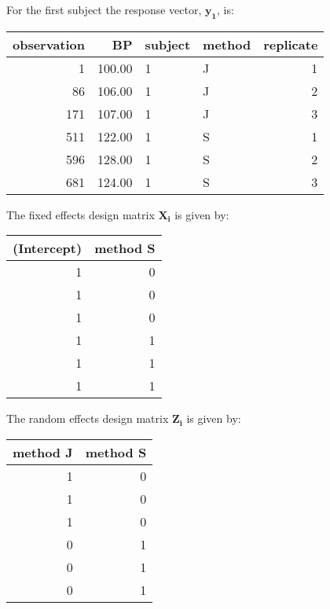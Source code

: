 \documentclass[Chap4cmain.tex]{subfiles}
\begin{document}
For the first subject the response vector, $\boldsymbol{y_{1}}$, is:
\begin{table}[ht]
\begin{center}
\begin{tabular}{rrllr}
  \hline
observation & BP & subject & method & replicate \\
  \hline
1 & 100.00 & 1 & J &   1 \\
  86 & 106.00 & 1 & J &   2 \\
  171 & 107.00 & 1 & J &   3 \\
  511 & 122.00 & 1 & S &   1 \\
  596 & 128.00 & 1 & S &   2 \\
  681 & 124.00 & 1 & S &   3 \\
   \hline
\end{tabular}
\end{center}
\end{table}
\newpage
The fixed effects design matrix $\boldsymbol{X_{i}}$ is given by:
\begin{table}[ht]
\begin{center}
\begin{tabular}{r|r}
  \hline
  (Intercept) & method S \\
  \hline
 1 & 0 \\
 1 & 0 \\
 1 & 0 \\
 1 & 1 \\
 1 & 1 \\
 1 & 1 \\
   \hline
\end{tabular}
\end{center}
\end{table}

\newpage




The random effects design matrix $\boldsymbol{Z_{i}}$ is given by:
\begin{table}[ht]
\begin{center}
\begin{tabular}{r|r}
  \hline
 method J & method S \\
  \hline
 1 & 0 \\
 1 & 0 \\
 1 & 0 \\
 0 & 1 \\
 0 & 1 \\
 0 & 1 \\
   \hline
\end{tabular}
\end{center}
\end{table}
\newpage
\end{document}
